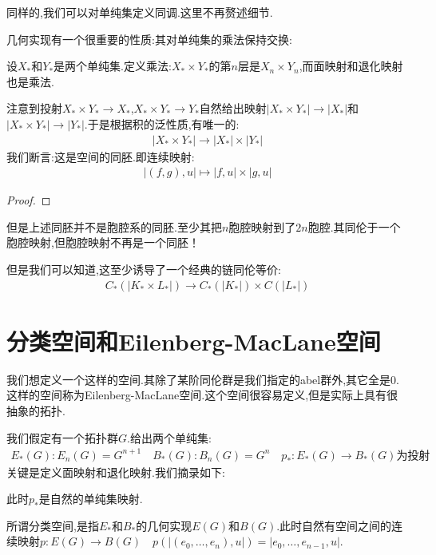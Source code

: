 同样的,我们可以对单纯集定义同调.这里不再赘述细节.

几何实现有一个很重要的性质:其对单纯集的乘法保持交换:
\begin{proposition}
    设$X_*$和$Y_*$是两个单纯集.定义乘法:$X_* \times Y_*$的第$n$层是$X_n \times Y_n$,而面映射和退化映射也是乘法.

    注意到投射$X_* \times Y_* \to X_*$,$X_* \times Y_* \to Y_*$自然给出映射$|X_* \times Y_*| \to|X_*|$和$|X_* \times Y_*| \to |Y_*|$.于是根据积的泛性质,有唯一的:
    \begin{align*}
        |X_* \times Y_*| \to |X_*| \times |Y_*|
    \end{align*}
    我们断言:这是空间的同胚.即连续映射:
    \begin{align*}
        |(f,g),u| \mapsto |f,u| \times |g,u| 
    \end{align*}
\end{proposition}
\begin{proof}
    
\end{proof}
但是上述同胚并不是胞腔系的同胚.至少其把$n$胞腔映射到了$2n$胞腔.其同伦于一个胞腔映射,但胞腔映射不再是一个同胚！

但是我们可以知道,这至少诱导了一个经典的链同伦等价:
\begin{align*}
    C_*(|K_* \times L_*|) \to C_*(|K_*|)\times C(|L_*|)
\end{align*}

\section{分类空间和Eilenberg-MacLane空间}
我们想定义一个这样的空间.其除了某阶同伦群是我们指定的abel群外,其它全是$0$.这样的空间称为Eilenberg-MacLane空间.这个空间很容易定义,但是实际上具有很抽象的拓扑.

我们假定有一个拓扑群$G$.给出两个单纯集:
\begin{align*}
    E_*(G):E_n(G)=G^{n+1}\quad B_*(G):B_{n}(G)=G^n \quad p_*:E_*(G)\to B_*(G)\text{为投射}
\end{align*}
关键是定义面映射和退化映射.我们摘录如下:

此时$p_*$是自然的单纯集映射.

所谓分类空间,是指$E_*$和$B_*$的几何实现$E(G)$和$B(G)$.此时自然有空间之间的连续映射$p:E(G) \to B(G)\quad p(|(e_0,\dots,e_n),u|)=|e_0,\dots,e_{n-1},u|$.

